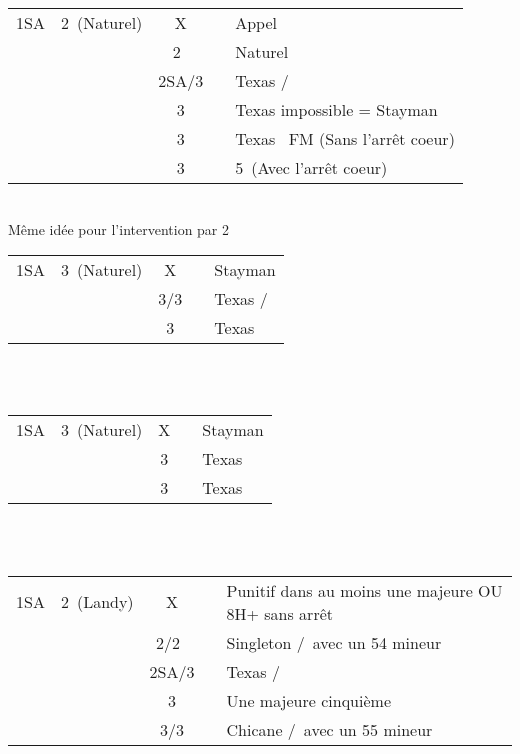 \documentclass[a4paper, oneside, 11pt]{report}
\begin{document}
		\begin{tabular}{cccc|l}
		1SA & 2\coeur\ (Naturel) & X && Appel\\
		&& 2\pique\ && Naturel\\
		&& 2SA/3\trefle && Texas \trefle/\carreau\\
		&& 3\carreau && Texas impossible = Stayman\\
		&& 3\coeur && Texas \pique\ FM (Sans l'arrêt coeur)\\
		&& 3\pique && 5\pique\ (Avec l'arrêt coeur)\\
		\end{tabular}\\
		Même idée pour l'intervention par 2\pique\\

		\begin{tabular}{cccc|l}
		1SA & 3\trefle\ (Naturel) & X && Stayman\\
		&& 3\carreau/3\coeur && Texas \coeur/\pique\\
		&& 3\pique && Texas \carreau\\
		\end{tabular}\\\\

		\begin{tabular}{cccc|l}
		1SA & 3\carreau\ (Naturel) & X && Stayman\\
		&& 3\coeur && Texas \pique\\
		&& 3\pique && Texas \coeur\\
		\end{tabular}\\\\

		\begin{tabular}{cccc|l}
		1SA & 2\trefle\ (Landy) & X && Punitif dans au moins une majeure OU 8H+ sans arrêt\\
		&& 2\coeur/2\pique\ && Singleton \coeur/\pique\ avec un 54 mineur\\
		&& 2SA/3\trefle && Texas \trefle/\carreau\\
		&& 3\carreau && Une majeure cinquième\\
		&& 3\coeur/3\pique && Chicane \coeur/\pique\ avec un 55 mineur\\
		\end{tabular}\\\\
\end{document}
